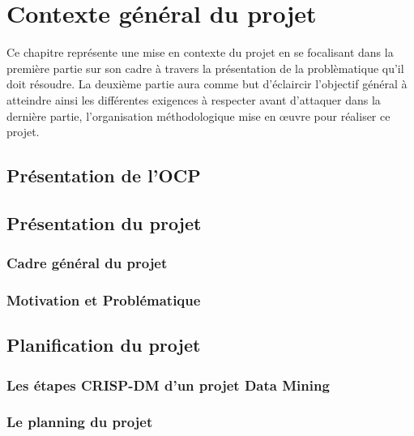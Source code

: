 \chapter{Contexte général du projet}

Ce chapitre représente une mise en contexte du projet en se focalisant dans la première partie sur son cadre à travers la présentation de la problèmatique qu'il doit résoudre. La deuxième partie aura comme but d'éclaircir l'objectif général à atteindre ainsi les différentes exigences à respecter avant d'attaquer dans la dernière partie, l'organisation méthodologique mise en œuvre pour réaliser ce projet.
\cleardoublepage

\section{Présentation de l’OCP}

	
\section{Présentation du projet}
	\subsection{Cadre général du projet}
	\subsection{Motivation et Problématique}


\section{Planification du projet}
	\subsection{Les étapes CRISP-DM d'un projet Data Mining}
	\subsection{Le planning du projet}